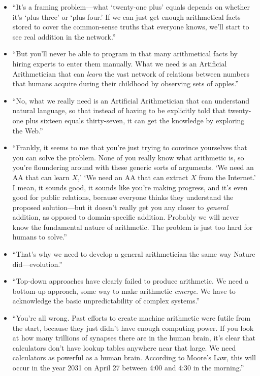{\begin{itemize}
\item {
 ``It's a framing problem---what
`twenty-one plus' equals depends on
whether it's `plus
three' or `plus four.'
If we can just get enough arithmetical facts stored to cover the
common-sense truths that everyone knows, we'll start to
see real addition in the network.''}

\item {
 ``But you'll never be able to
program in that many arithmetical facts by hiring experts to enter them
manually. What we need is an Artificial Arithmetician that can
\textit{learn} the vast network of relations between numbers that
humans acquire during their childhood by observing sets of
apples.''}

\item {
 ``No, what we really need is an Artificial
Arithmetician that can understand natural language, so that instead of
having to be explicitly told that twenty-one plus sixteen equals
thirty-seven, it can get the knowledge by exploring the
Web.''}

\item {
 ``Frankly, it seems to me that
you're just trying to convince yourselves that you can
solve the problem. None of you really know what arithmetic is, so
you're floundering around with these generic sorts of
arguments. `We need an AA that can learn
$X$,' `We need an AA that can extract $X$
from the Internet.' I mean, it sounds good, it sounds
like you're making progress, and it's
even good for public relations, because everyone thinks they understand
the proposed solution---but it doesn't really get you
any closer to \textit{general} addition, as opposed to domain-specific
addition. Probably we will never know the fundamental nature of
arithmetic. The problem is just too hard for humans to
solve.''}

\item {
 ``That's why we need to develop a
general arithmetician the same way Nature
did---evolution.''}

\item {
 ``Top-down approaches have clearly failed to
produce arithmetic. We need a bottom-up approach, some way to make
arithmetic \textit{emerge.} We have to acknowledge the basic
unpredictability of complex systems.''}

\item {
 ``You're all wrong. Past efforts
to create machine arithmetic were futile from the start, because they
just didn't have enough computing power. If you look at
how many trillions of synapses there are in the human brain,
it's clear that calculators don't have
lookup tables anywhere near that large. We need calculators as powerful
as a human brain. According to Moore's Law, this will
occur in the year 2031 on April 27 between 4:00 and 4:30 in the
morning.''}


\end{itemize}}
